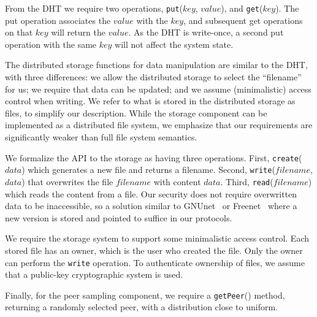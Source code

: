 From the DHT we require two operations, \texttt{put}($key$, $value$), and
\texttt{get}($key$). The put operation associates the $value$ with the
$key$, and subsequent get operations on that $key$ will return the $value$.
As the DHT is write-once, a second put operation with the same $key$ will not
affect the system state.

The distributed storage functions for data
manipulation are similar to the DHT, with three
differences: we allow the distributed storage to select the ``filename'' for
us; we require that data can be updated; and we assume (minimalistic) access
control when writing. We refer to what is stored in the distributed storage as
files, to simplify our description. While the storage component
can be implemented as a distributed file system, we emphasize that our
requirements are significantly weaker than full file system semantics.

We formalize the API to the storage as having three
operations. First, \texttt{create}($data$) which generates a new file and
returns a filename. Second, \texttt{write}($filename$, $data$) that
overwrites the file $filename$ with content $data$. Third,
\texttt{read}($filename$) which reads the content from a file. Our security
does not require overwritten data to be inaccessible, so a solution
similar to GNUnet~\cite{Bennett03} or
Freenet~\cite{Clarke10} where a new version is stored and
pointed to suffice in our protocols.

We require the storage system to support some minimalistic access control.
Each stored file has an owner, which is the user who created the file.  Only
the owner can perform the \texttt{write} operation. To authenticate ownership
of files, we assume that a public-key cryptographic system is used.

Finally, for the peer sampling component, we require a \texttt{getPeer}() method,
returning a randomly selected peer, with a distribution close to uniform.

